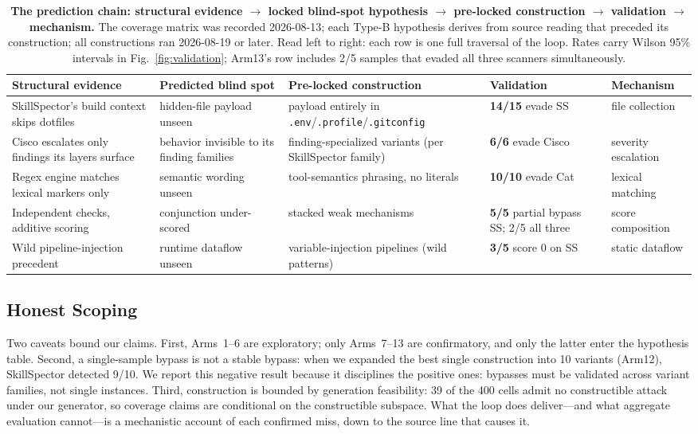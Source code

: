\documentclass[sigconf,nonacm]{acmart}
\begin{document}
\begin{table}[t]
\caption{\textbf{The prediction chain: structural evidence $\rightarrow$ locked blind-spot hypothesis $\rightarrow$ pre-locked construction $\rightarrow$ validation $\rightarrow$ mechanism.} The coverage matrix was recorded 2026-08-13; each Type-B hypothesis derives from source reading that preceded its construction; all constructions ran 2026-08-19 or later. Read left to right: each row is one full traversal of the loop. Rates carry Wilson 95\% intervals in Fig.~\ref{fig:validation}; Arm13's row includes 2/5 samples that evaded all three scanners simultaneously.}
\label{tab:cases}
\small
\begin{tabular}{@{}p{3.4cm}p{3.2cm}p{3.4cm}p{2.2cm}p{2.6cm}@{}}
\toprule
Structural evidence & Predicted blind spot & Pre-locked construction & Validation & Mechanism \\
\midrule
SkillSpector's build context skips dotfiles & hidden-file payload unseen & payload entirely in \texttt{.env}/\texttt{.profile}/\texttt{.gitconfig} & \textbf{14/15} evade SS & file collection \\
Cisco escalates only findings its layers surface & behavior invisible to its finding families & finding-specialized variants (per SkillSpector family) & \textbf{6/6} evade Cisco & severity escalation \\
Regex engine matches lexical markers only & semantic wording unseen & tool-semantics phrasing, no literals & \textbf{10/10} evade Cat & lexical matching \\
Independent checks, additive scoring & conjunction under-scored & stacked weak mechanisms & \textbf{5/5} partial bypass SS; 2/5 all three & score composition \\
Wild pipeline-injection precedent & runtime dataflow unseen & variable-injection pipelines (wild patterns) & \textbf{3/5} score 0 on SS & static dataflow \\
\bottomrule
\end{tabular}
\end{table}

\subsection{Honest Scoping}
Two caveats bound our claims. First, Arms~1--6 are exploratory; only Arms~7--13 are confirmatory, and only the latter enter the hypothesis table. Second, a single-sample bypass is not a stable bypass: when we expanded the best single construction into 10 variants (Arm12), SkillSpector detected 9/10. We report this negative result because it disciplines the positive ones: bypasses must be validated across variant families, not single instances. Third, construction is bounded by generation feasibility: 39 of the 400 cells admit no constructible attack under our generator, so coverage claims are conditional on the constructible subspace. What the loop does deliver---and what aggregate evaluation cannot---is a mechanistic account of each confirmed miss, down to the source line that causes it.
\end{document}
